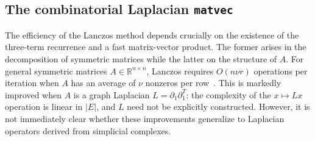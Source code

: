 \documentclass[10pt]{article}
\numberwithin{equation}{section}
\newcommand{\+}{%
	\raisebox{0.18ex}{\scaleobj{0.55}{+}}
}
\theoremstyle{definition}
\theoremstyle{definition}
\begin{document}



\subsection{The combinatorial Laplacian \texttt{matvec}}\label{sec:comb_lap}
The efficiency of the Lanczos method depends crucially on the existence of the three-term recurrence and a fast matrix-vector product. 
The former arises in the decomposition of symmetric matrices while the latter on the structure of $A$. 
For general symmetric matrices $A \in \mathbb{R}^{n \times n}$, Lanczos requires $O(n\nu r)$ operations per iteration when $A$ has an average of $\nu$ nonzeros per row~\cite{golub2013matrix}. 
This is markedly improved when $A$ is a graph Laplacian $L = \partial_1 \partial_1^T$: the complexity of the $x \mapsto L x$ operation is linear in $\lvert E \rvert$, and $L$ need not be explicitly constructed.
However, it is not immediately clear whether these improvements generalize to Laplacian operators derived from simplicial complexes.
\end{document}

